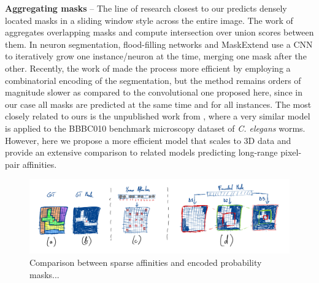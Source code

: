 \textbf{Aggregating \maskname masks} -- 
The line of research closest to our predicts densely located \maskname masks in a sliding window style across the entire image. The work of \cite{liu2016multi} aggregates overlapping masks and compute intersection over union scores between them.
In neuron segmentation, flood-filling networks \cite{januszewski2018high} and MaskExtend \cite{meirovitch2016multi} use a CNN to iteratively grow one instance/neuron at the time, merging one mask after the other. Recently, the work of \cite{meirovitch2019cross} made the process more efficient by employing a combinatorial encoding of the segmentation, but the method remains orders of magnitude slower as compared to the convolutional one proposed here, since in our case all masks are predicted at the same time and for all instances.
The most closely related to ours is the unpublished work from \cite{hirsch2020patchperpix}, where a very similar model is applied to the BBBC010 benchmark microscopy dataset of \emph{C. elegans} worms. However, here we propose a more efficient model that scales to 3D data and provide an extensive comparison to related models predicting long-range pixel-pair affinities. 

\begin{figure}[t]
\centering
        \includegraphics[width=\textwidth]{./figs/masks_explained.jpg} %
        \caption{Comparison between sparse affinities and encoded probability masks...}
    \label{fig:comparing_masks_affs}
\end{figure}


